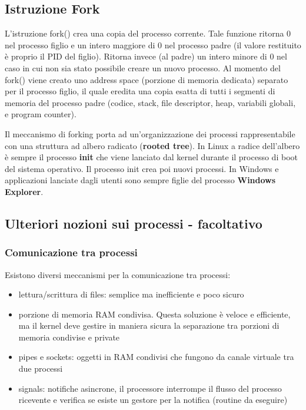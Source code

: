 \subsection{Istruzione Fork}
L’istruzione fork() crea una copia del processo corrente. Tale funzione ritorna 0 nel processo figlio e un intero maggiore di 0 nel processo padre (il valore restituito è proprio il PID del figlio). Ritorna invece (al padre) un intero minore di 0 nel caso in cui non sia stato possibile creare un nuovo processo. Al momento del fork() viene creato uno address space (porzione di memoria dedicata) separato per il processo figlio, il quale eredita una copia esatta di tutti i segmenti di memoria del processo padre (codice, stack, file descriptor, heap, variabili globali, e program counter).\newline \newline

Il meccanismo di forking porta ad un'organizzazione dei processi rappresentabile con una struttura ad albero radicato (\textbf{rooted tree}). In Linux a radice dell’albero è sempre il processo \textbf{init} che viene lanciato dal kernel durante il processo di boot del sistema operativo. Il processo init crea poi nuovi processi. In Windows e applicazioni lanciate dagli utenti sono sempre figlie del processo \textbf{Windows Explorer}.

\subsection{Ulteriori nozioni sui processi - facoltativo}
\subsubsection{Comunicazione tra processi}
Esistono diversi meccanismi per la comunicazione tra processi:
\begin{itemize}
  \item lettura/scrittura di files: semplice ma inefficiente e poco sicuro
  \item porzione di memoria RAM condivisa. Questa soluzione è veloce e efficiente, ma il kernel deve gestire in maniera sicura la separazione tra porzioni di memoria condivise e private
  \item pipes e sockets: oggetti in RAM condivisi che fungono da canale virtuale tra due processi
  \item signals: notifiche asincrone, il processore interrompe il flusso del processo ricevente e verifica se esiste un gestore per la notifica (routine da eseguire)
\end{itemize}


